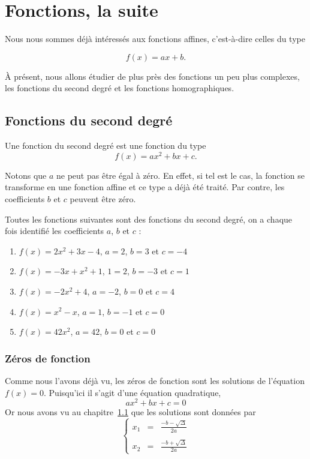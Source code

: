 \chapter{Fonctions, la suite}

Nous nous sommes déjà  intéressés aux fonctions affines, c'est-à-dire celles du type 

$$
f(x) = ax+b.
$$

À présent, nous allons étudier de plus près des fonctions un peu plus complexes, les fonctions du second degré et les fonctions homographiques.

\section{Fonctions du second degré}\label{seconddegre}

Une fonction du second degré est une fonction du type
$$
f(x) = ax^2 + bx + c.
$$

Notons que $a$ ne peut pas être égal à zéro. En effet, si tel est le cas, la fonction se transforme en une fonction affine et ce type a déjà été traité. Par contre, les coefficients $b$ et $c$ peuvent être zéro.

\begin{exemple}
Toutes les fonctions suivantes sont des fonctions du second degré, on a chaque fois identifié les coefficients $a$, $b$ et $c$ :
\newpage %
\begin{multicols}{2}
\begin{enumerate}
\item $f(x) = 2x^2 +3x -4$, $a=2$, $b=3$ et $c=-4$
\item $f(x) = -3x+x^2 +1$, $1=2$, $b=-3$ et $c=1$
\item $f(x) = -2x^2 + 4$, $a=-2$, $b=0$ et $c=4$
\item $f(x) = x^2 -x$, $a=1$, $b=-1$ et $c=0$
\item $f(x) = 42x^2$, $a=42$, $b=0$ et $c=0$
\end{enumerate}
\end{multicols}
\end{exemple}

\subsection{Zéros de fonction}

Comme nous l'avons déjà vu, les zéros de fonction sont les solutions de l'équation $f(x) = 0$. Puisqu'ici il s'agit d'une équation quadratique,
$$
ax^2 + bx + c = 0
$$
Or nous avons vu au chapitre~\ref{seconddegre} que les solutions sont données par
$$
\left\{
\begin{array}{lcl}
x_1 &=& \frac{-b-\sqrt{\Delta}}{2a}\\
&&\\
x_2 &=& \frac{-b+\sqrt{\Delta}}{2a}
\end{array}
\right.
$$

